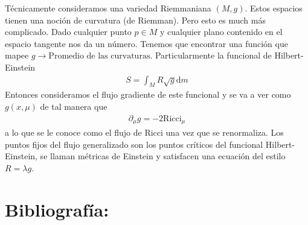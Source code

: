 \documentclass{article}
\theoremstyle{mytheoremstyle}
\theoremstyle{mytheoremstyle}
\theoremstyle{myproblemstyle}
\begin{document}
      Técnicamente consideramos una variedad Riemmaniana $(M,g)$. Estos espacios tienen una noción de curvatura (de Riemman). Pero esto es much más complicado. Dado cualquier punto $p\in M$ y cualquier plano contenido en el espacio tangente nos da un número. Tenemos que encontrar una función que mapee $g\longrightarrow\text{Promedio de las curvaturas}$. Particularmente la funcional de Hilbert-Einstein 
      \begin{align}
          S=\int_{M}R\sqrt{g} \mathrm{d} m
      \end{align}
       Entonces consideramos el flujo gradiente de este funcional y se va a ver como $g(x,\mu)$ de tal manera que 
       \begin{align}
        \partial_\mu g =  -2 \text{Ricci}_\mu 
       \end{align}
       a lo que se le conoce como el flujo de Ricci una vez que se renormaliza. Los puntos fijos del flujo generalizado son los puntos críticos del funcional Hilbert-Einstein, se llaman métricas de Einstein y satisfacen una ecuación del estilo $R=\lambda g$.














      \section{Bibliografía:}
        
\end{document}
